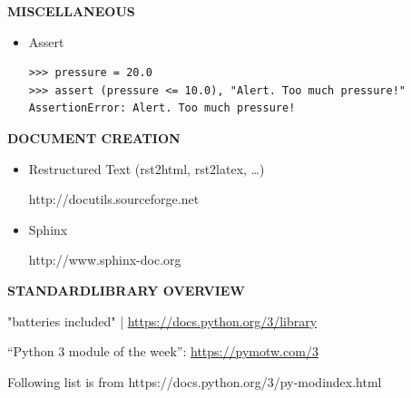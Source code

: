 \documentclass[9pt,a4wide]{extarticle}
\begin{document}
\bigskip
{\LARGE\bf MISCELLANEOUS}

\begin{itemize}
\item Assert

\begin{verbatim}
>>> pressure = 20.0
>>> assert (pressure <= 10.0), "Alert. Too much pressure!"
AssertionError: Alert. Too much pressure!
\end{verbatim}

\end{itemize}



\bigskip
{\LARGE\bf DOCUMENT CREATION}

\begin{itemize}

\item Restructured Text (rst2html, rst2latex, \dots{})

   http://docutils.sourceforge.net

\item Sphinx

   http://www.sphinx-doc.org

\end{itemize}




\bigskip
{\LARGE\bf STANDARDLIBRARY OVERVIEW}

"batteries included" | \url{https://docs.python.org/3/library}

``Python 3 module of the week'': \url{https://pymotw.com/3}

Following list is from https://docs.python.org/3/py-modindex.html
\end{document}
